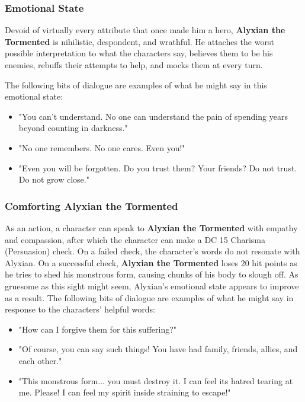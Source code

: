 \documentclass[10pt,a4paper,twoside,fancy,bg=print,twocolumn,openany,nodeprecatedcode]{dndbook}
\begin{document}
\subsubsection{Emotional State}
Devoid of virtually every attribute that once made him a hero, \textbf{Alyxian the Tormented} is nihilistic, despondent, and wrathful. He attaches the worst possible interpretation to what the characters say, believes them to be his enemies, rebuffs their attempts to help, and mocks them at every turn.

The following bits of dialogue are examples of what he might say in this emotional state:


\begin{itemize}
\item "You can't understand. No one can understand the pain of spending years beyond counting in darkness."
\item "No one remembers. No one cares. Even you!"
\item "Even you will be forgotten. Do you trust them? Your friends? Do not trust. Do not grow close."
\end{itemize}

\subsubsection{Comforting Alyxian the Tormented}
As an action, a character can speak to \textbf{Alyxian the Tormented} with empathy and compassion, after which the character can make a DC 15 Charisma (Persuasion) check. On a failed check, the character's words do not resonate with Alyxian. On a successful check, \textbf{Alyxian the Tormented} loses 20 hit points as he tries to shed his monstrous form, causing chunks of his body to slough off. As gruesome as this sight might seem, Alyxian's emotional state appears to improve as a result. The following bits of dialogue are examples of what he might say in response to the characters' helpful words:


\begin{itemize}
\item "How can I forgive them for this suffering?"
\item "Of course, you can say such things! You have had family, friends, allies, and each other."
\item "This monstrous form... you must destroy it. I can feel its hatred tearing at me. Please! I can feel my spirit inside straining to escape!"
\end{itemize}
\end{document}
